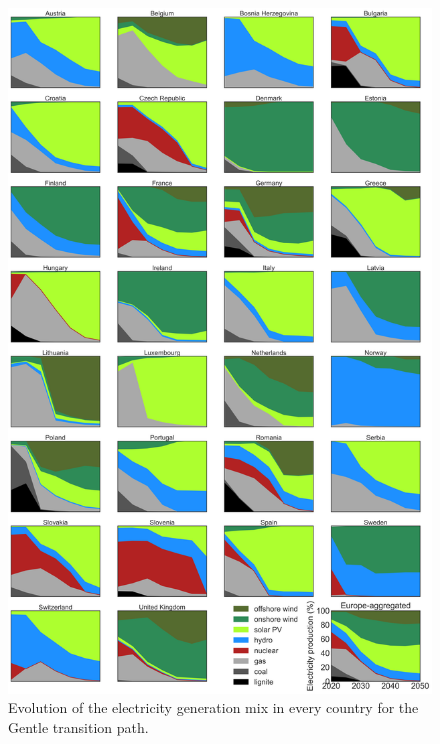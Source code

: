 \documentclass[3p]{elsarticle} %
\begin{document}
\begin{figure}[!h]
\centering
\includegraphics[width=0.8\columnwidth]{figures/electricity_production_Base_go_oldversion.png}
\caption{Evolution of the electricity generation mix in every country for the Gentle transition path.} \label{fig_primary_energy} 
\end{figure}
\end{document}
